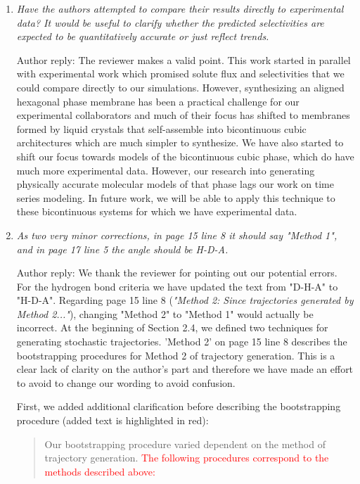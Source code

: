 \documentclass{article}
\begin{document}
\begin{enumerate}[label={Comment \theenumi :}, leftmargin=3.9\parindent]
\begin{quote}
    \end{quote}
    
    \item \textit{Have the authors attempted to compare their results directly to experimental data? 
    It would be useful to clarify whether the predicted selectivities are expected to be quantitatively
    accurate or just reflect trends.}
		 
    Author reply: The reviewer makes a valid point. This work started in parallel with experimental
    work which promised solute flux and selectivities that we could compare directly to our
	simulations. However, synthesizing an aligned hexagonal phase membrane has been a practical
	challenge for our experimental collaborators and much of their focus has shifted to 
	membranes formed by liquid crystals that self-assemble into bicontinuous cubic architectures
	which are much simpler to synthesize. We have also started to shift our focus towards models 
	of the bicontinuous cubic phase, which do have much more experimental data. However, our 
	research into generating physically accurate molecular models of that phase lags our work on
	time series modeling. In future work, we will be able to apply this technique to these 
	bicontinuous systems for which we have experimental data.

    \item \textit{As two very minor corrections, in page 15 line 8 it should say "Method 1", and in 
    page 17 line 5 the angle should be H-D-A.}
    
    Author reply: We thank the reviewer for pointing out our potential errors. For the hydrogen bond
    criteria we have updated the text from "D-H-A" to "H-D-A". Regarding page 15 line 8 (\textit{"Method 2:
    Since trajectories generated by Method 2..."}), changing "Method 2" to "Method 1" would actually be 
    incorrect. At the beginning of Section 2.4, we defined two techniques for generating stochastic 
    trajectories. 'Method 2' on page 15 line 8 describes the bootstrapping procedures for Method 2 of
    trajectory generation. This is a clear lack of clarity on the author's part and therefore we 
    have made an effort to avoid to change our wording to avoid confusion.
    
    First, we added additional clarification before describing the bootstrapping procedure (added text
    is highlighted in red):
    \begin{quote}
    Our bootstrapping procedure varied dependent on the method of trajectory generation. \textcolor{red}{
    The following procedures correspond to the methods described above:}
    \end{quote}
    

\end{enumerate}
\end{document}
